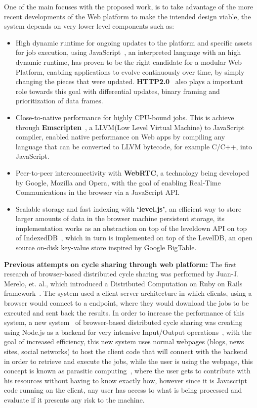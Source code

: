 One of the main focuses with the proposed work, is to take advantage of the more recent developments of the Web platform to make the intended design viable, the system depends on very lower level components such as:
\begin{itemize}
  \item High dynamic runtime for ongoing updates to the platform and specific assets for job execution, using JavaScript~\cite{Ecma2009}, an interpreted language with an high dynamic runtime, has proven to be the right candidate for a modular Web Platform, enabling applications to evolve continuously over time, by simply changing the pieces that were updated. \textbf{HTTP2.0}~\cite{Thomson2013} also plays a important role towards this goal with differential updates, binary framing and prioritization of data frames.
  \item Close-to-native performance for highly CPU-bound jobs. This is achieve through \textbf{Emscripten}~\cite{Zakai2011}, a LLVM(Low Level Virtual Machine) to JavaScript compiler, enabled native performance on Web apps by compiling any language that can be converted to LLVM bytecode, for example C/C++, into JavaScript.
  \item Peer-to-peer interconnectivity with \textbf{WebRTC}\cite{IanHickson2013}, a technology being developed by Google, Mozilla and Opera, with the goal of enabling Real-Time Communications in the browser via a JavaScript API.
  \item Scalable storage and fast indexing with \textbf{`level.js'}, an efficient way to store larger amounts of data in the browser machine persistent storage, its implementation works as an abstraction on top of the leveldown API on top of IndexedDB~\cite{Recommendation2013}, which in turn is implemented on top of the LevelDB, an open source on-disk key-value store inspired by Google BigTable.
\end{itemize}


\textbf{Previous attempts on cycle sharing through web platform: }
The first research of browser-based distributed cycle sharing was performed by Juan-J. Merelo, et. al., which introduced a Distributed Computation on Ruby on Rails framework~\cite{Merelo2007}. The system used a client-server architecture in which clients, using a browser would connect to a endpoint, where they would download the jobs to be executed and sent back the results. In order to increase the performance of this system, a new system~\cite{Duda2013} of browser-based distributed cycle sharing was creating using Node.js as a backend for very intensive Input/Output operations~\cite{Tilkov2010}, with the goal of increased efficiency, this new system uses normal webpages (blogs, news sites, social networks) to host the client code that will connect with the backend in order to retrieve and execute the jobs, while the user is using the webpage, this concept is known as parasitic computing~\cite{Barabasi2001}, where the user gets to contribute with his resources without having to know exactly how, however since it is Javascript code running on the client, any user has access to what is being processed and evaluate if it presents any risk to the machine.


